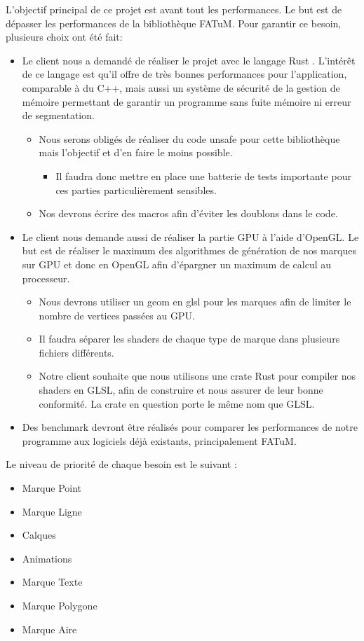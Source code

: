 \documentclass[12pt]{article}
\begin{document}
L'objectif principal de ce projet est avant tout les performances. Le but est de dépasser les performances de la bibliothèque FATuM. Pour garantir
ce besoin, plusieurs choix ont été fait:
	\begin{itemize}
		\item Le client nous a demandé de réaliser le projet avec le langage Rust \cite{rust}. L'intérêt de ce langage est qu'il offre de très bonnes
		performances pour l'application, comparable à du C++, mais aussi un système de sécurité de la gestion de mémoire permettant de garantir un programme
		sans fuite mémoire ni erreur de segmentation.
		\begin{itemize}
			\item Nous serons obligés de réaliser du code \gls{unsafe} pour cette bibliothèque mais l'objectif et d'en faire le moins possible.
			\begin{itemize}
				\item Il faudra donc mettre en place une batterie de tests importante pour ces parties particulièrement sensibles.
			\end{itemize}
			\item Nos devrons écrire des macros afin d'éviter les doublons dans le code.
		\end{itemize}
		\item Le client nous demande aussi de réaliser la partie GPU à l'aide d'OpenGL. Le but est de réaliser le maximum des algorithmes de génération de nos marques sur GPU et donc en OpenGL afin d'épargner un maximum de calcul au processeur.
		\begin{itemize}
			\item Nous devrons utiliser un \gls{geom} en glsl pour les marques afin de limiter le nombre de vertices passées au GPU.
			\item Il faudra séparer les \gls{shader}s de chaque type de marque dans plusieurs fichiers différents.
			\item Notre client souhaite que nous utilisons une crate Rust pour compiler
			nos shaders en GLSL, afin de construire et nous assurer de leur bonne conformité.
			La crate en question porte le même nom que GLSL\cite{GLSL}.
		\end{itemize}
		\item Des benchmark devront être réalisés pour comparer les performances de notre programme aux logiciels déjà existants, principalement FATuM.

	\end{itemize}
Le niveau de priorité de chaque besoin est le suivant :
\begin{itemize}
	\item Marque Point
	\item Marque Ligne
	\item Calques
	\item Animations
	\item Marque Texte
	\item Marque Polygone
	\item Marque Aire
\end{itemize}
\end{document}
